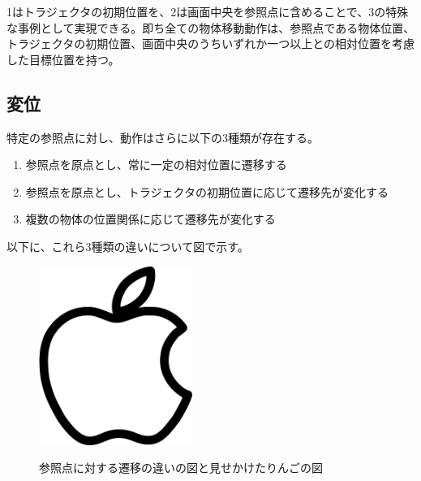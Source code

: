 
1はトラジェクタの初期位置を、2は画面中央を参照点に含めることで、3の特殊な事例として実現できる。即ち全ての物体移動動作は、参照点である物体位置、トラジェクタの初期位置、画面中央のうちいずれか一つ以上との相対位置を考慮した目標位置を持つ。

\subsection{変位}

特定の参照点に対し、動作はさらに以下の3種類が存在する。

	\begin{enumerate}
		\item 参照点を原点とし、常に一定の相対位置に遷移する
		\item 参照点を原点とし、トラジェクタの初期位置に応じて遷移先が変化する
		\item 複数の物体の位置関係に応じて遷移先が変化する
	\end{enumerate}
以下に、これら3種類の違いについて図で示す。

	\begin{figure}[t]
		\begin{center}
			\includegraphics[width=5cm]{apple.png} \\ %
			\caption{参照点に対する遷移の違いの図と見せかけたりんごの図}
		\end{center}
	\end{figure}



